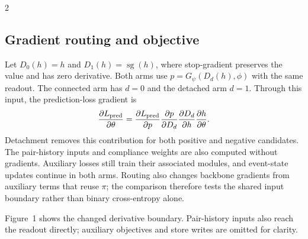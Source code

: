 \documentclass[a4paper,10pt,fleqn]{article}
\renewcommand{\small}{\fontsize{8}{12}\selectfont}
\newcommand{\sg}{\operatorname{sg}}
\begin{document}
\begin{multicols}{2}
\subsection{Gradient routing and objective}
Let $D_0(h)=h$ and $D_1(h)=\operatorname{sg}(h)$, where stop-gradient preserves the value and has zero derivative. Both arms use $p=G_\psi(D_d(h),\phi)$ with the same readout. The connected arm has $d=0$ and the detached arm $d=1$. Through this input, the prediction-loss gradient is
\begin{equation}
\frac{\partial L_{\rm pred}}{\partial\theta}
=\frac{\partial L_{\rm pred}}{\partial p}
\frac{\partial p}{\partial D_d}
\frac{\partial D_d}{\partial h}
\frac{\partial h}{\partial\theta}.
\label{eq:chain}
\end{equation}
Detachment removes this contribution for both positive and negative candidates. The pair-history inputs and compliance weights are also computed without gradients. Auxiliary losses still train their associated modules, and event-state updates continue in both arms. Routing also changes backbone gradients from auxiliary terms that reuse $\pi$; the comparison therefore tests the shared input boundary rather than binary cross-entropy alone.

\begin{center}
\begin{minipage}{\linewidth}\centering
{}
\end{minipage}
\end{center}
Figure~1 shows the changed derivative boundary. Pair-history inputs also reach the readout directly; auxiliary objectives and store writes are omitted for clarity.


\end{multicols}
\end{document}
